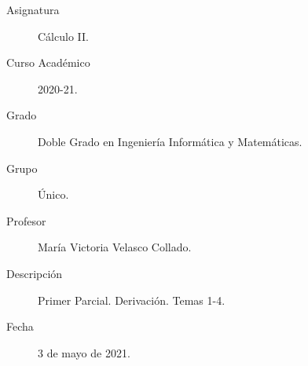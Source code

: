 \documentclass[12pt]{article}
\begin{document}

    
    

    \begin{description}
        \item[Asignatura] Cálculo II.
        \item[Curso Académico] 2020-21.
        \item[Grado] Doble Grado en Ingeniería Informática y Matemáticas.
        \item[Grupo] Único.
        \item[Profesor] María Victoria Velasco Collado.
        \item[Descripción] Primer Parcial. Derivación. Temas 1-4.
        \item[Fecha] 3 de mayo de 2021.
    
    \end{description}
    \newpage
    
\end{document}
